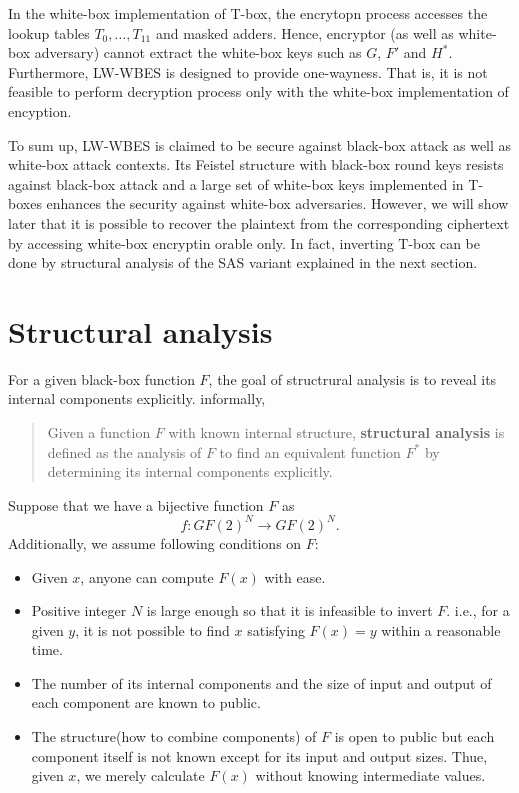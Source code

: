\documentclass{ieeeaccess}
\begin{document}
In the white-box implementation of T-box,
the encrytopn process accesses the lookup tables
$T_0, \ldots, T_{11}$ and masked adders.
Hence, encryptor (as well as white-box adversary) cannot extract
the white-box keys such as $G$, $F'$ and $H^*$.
Furthermore, LW-WBES is designed to provide one-wayness.
That is, it is not feasible to perform decryption process 
only with the white-box implementation of encyption.

To sum up, LW-WBES is claimed to be secure 
against black-box attack as well as white-box attack contexts.
Its Feistel structure with black-box round keys  resists against
black-box attack and a large set of white-box keys implemented in T-boxes
enhances the security against white-box adversaries.
However, we will show later that it is possible to recover the plaintext from 
the corresponding ciphertext by accessing white-box encryptin orable only.
In fact, inverting T-box can be done by structural analysis of the SAS variant
explained in the next section.

\section{Structural analysis}

For a given black-box function $F$,
the goal of structrural analysis is to reveal its internal components explicitly.
informally,
\begin{quote}
Given a function $F$ with known internal structure,
{\bf structural analysis} is defined as the analysis of $F$
to find an equivalent function $F^*$ by determining its internal components explicitly.
\end{quote}

Suppose that we have a bijective function $F$ as
\[
f:GF(2)^N \to GF(2)^N.
\] 
Additionally, we assume following conditions on $F$:
\begin{itemize}
\item Given $x$, anyone can compute $F(x)$ with ease.
\item Positive integer $N$ is large enough so that it is infeasible to invert $F$.
i.e., for a given $y$, it is not possible to find $x$ satisfying 
$F(x) = y$ within a reasonable time. 
\item The number of its internal components and the size of input and output
of each component are known to public. 
\item The structure(how to combine components) of $F$ is open to public
but each component itself is not known except for its input and output sizes.
Thue, given $x$, we merely calculate $F(x)$ without knowing intermediate values.
\end{itemize}
\end{document}
